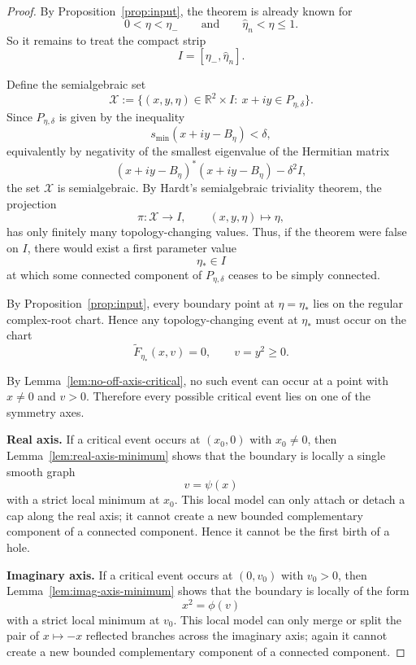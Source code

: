\documentclass[11pt]{article}
\begin{document}
\begin{proof}
By Proposition~\ref{prop:input}, the theorem is already known for
\[
0<\eta<\eta_-
\qquad\text{and}\qquad
\widehat\eta_n<\eta\le 1.
\]
So it remains to treat the compact strip
\[
I=[\eta_-,\widehat\eta_n].
\]

Define the semialgebraic set
\[
\mathcal X:=
\{(x,y,\eta)\in\mathbb R^2\times I:\ x+iy\in P_{\eta,\delta}\}.
\]
Since \(P_{\eta,\delta}\) is given by the inequality
\[
s_{\min}(x+iy-B_\eta)<\delta,
\]
equivalently by negativity of the smallest eigenvalue of the Hermitian matrix
\[
(x+iy-B_\eta)^*(x+iy-B_\eta)-\delta^2I,
\]
the set \(\mathcal X\) is semialgebraic. By Hardt's semialgebraic triviality theorem, the projection
\[
\pi:\mathcal X\to I,\qquad (x,y,\eta)\mapsto\eta,
\]
has only finitely many topology-changing values. Thus, if the theorem were false on \(I\), there would exist a first parameter value
\[
\eta_*\in I
\]
at which some connected component of \(P_{\eta,\delta}\) ceases to be simply connected.

By Proposition~\ref{prop:input}, every boundary point at \(\eta=\eta_*\) lies on the regular complex-root chart. Hence any topology-changing event at \(\eta_*\) must occur on the chart
\[
\widetilde F_{\eta_*}(x,v)=0,\qquad v=y^2\ge0.
\]

By Lemma~\ref{lem:no-off-axis-critical}, no such event can occur at a point with \(x\neq0\) and \(v>0\). Therefore every possible critical event lies on one of the symmetry axes.

\smallskip

\noindent
\textbf{Real axis.}
If a critical event occurs at \((x_0,0)\) with \(x_0\neq0\), then Lemma~\ref{lem:real-axis-minimum} shows that the boundary is locally a single smooth graph
\[
v=\psi(x)
\]
with a strict local minimum at \(x_0\). This local model can only attach or detach a cap along the real axis; it cannot create a new bounded complementary component of a connected component. Hence it cannot be the first birth of a hole.

\smallskip

\noindent
\textbf{Imaginary axis.}
If a critical event occurs at \((0,v_0)\) with \(v_0>0\), then Lemma~\ref{lem:imag-axis-minimum} shows that the boundary is locally of the form
\[
x^2=\phi(v)
\]
with a strict local minimum at \(v_0\). This local model can only merge or split the pair of \(x\mapsto -x\) reflected branches across the imaginary axis; again it cannot create a new bounded complementary component of a connected component.


\end{proof}
\end{document}
